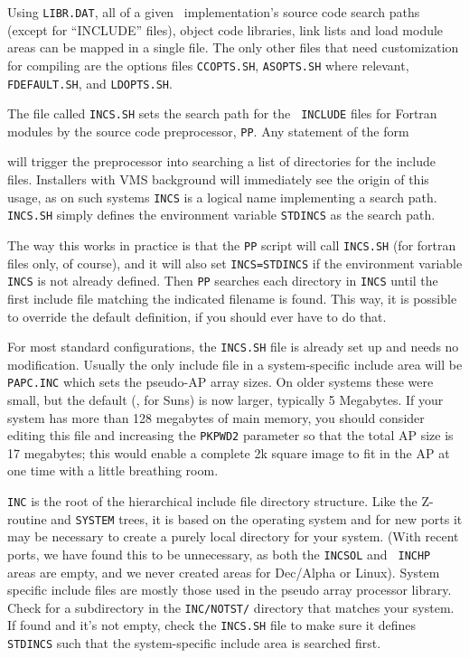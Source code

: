 Using {\tt LIBR.DAT}, all of a given \AIPS\ implementation's source code
search paths (except for ``INCLUDE'' files), object code libraries, link
lists and load module areas can be mapped in a single file.  The only
other files that need customization for compiling are the options files
{\tt CCOPTS.SH}, {\tt ASOPTS.SH} where relevant, {\tt FDEFAULT.SH}, and
{\tt LDOPTS.SH}.
\medskip


The file called {\tt INCS.SH} sets the search path for the {\tt
INCLUDE} files for Fortran modules by the source code preprocessor,
{\tt PP}.  Any statement of the form\medskip


\noindent will trigger the preprocessor into searching a list of
directories for the include files.  Installers with VMS background will
immediately see the origin of this usage, as on such systems {\tt INCS}
is a logical name implementing a search path.  {\tt INCS.SH} simply
defines the environment variable {\tt\dol STDINCS} as the search path.

The way this works in practice is that the {\tt PP} script will call
{\tt INCS.SH} (for fortran files only, of course), and it will also set
{\tt INCS=\dol STDINCS} if the environment variable {\tt INCS} is not
already defined.  Then {\tt PP} searches each directory in {\tt INCS}
until the first include file matching the indicated filename is found.
This way, it is possible to override the default definition, if you
should ever have to do that.

For most standard configurations, the {\tt INCS.SH} file is already
set up and needs no modification.  Usually the only include file in a
system-specific include area will be {\tt PAPC.INC} which sets the
pseudo-AP array sizes.  On older systems these were small, but the
default (\eg, for Suns) is now larger, typically 5 Megabytes.  If your
system has more than 128 megabytes of main memory, you should consider
editing this file and increasing the {\tt PKPWD2} parameter so that the
total AP size is 17 megabytes; this would enable a complete 2k square
image to fit in the AP at one time with a little breathing room.


{\tt\dol INC} is the root of the hierarchical include file directory
structure.  Like the Z-routine and {\tt SYSTEM} trees, it is based on
the operating system and for new ports it may be necessary to create a
purely local directory for your system.  (With recent ports, we have
found this to be unnecessary, as both the {\tt\dol INCSOL} and {\tt
\dol INCHP} areas are empty, and we never created areas for Dec/Alpha or
Linux).  System specific include files are mostly those used in the
pseudo array processor library.  Check for a subdirectory in the
{\tt\dol INC/NOTST/} directory that matches your system.  If found and it's
not empty, check the {\tt INCS.SH} file to make sure it defines {\tt
STDINCS} such that the system-specific include area is searched first.

